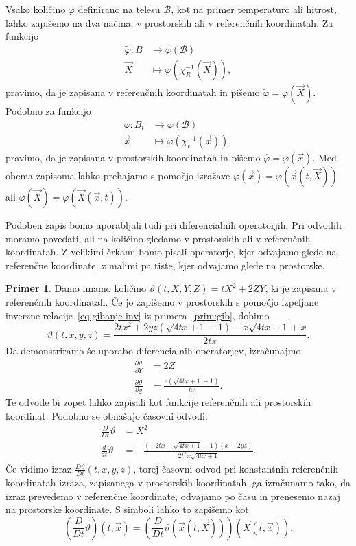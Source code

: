 \documentclass[a4paper,twoside]{article}
\theoremstyle{definition} %
\newtheorem{primer}[definicija]{Primer}
\theoremstyle{plain} %
\numberwithin{equation}{section}
\newcommand{\B}{\mathcal{B}}
\renewcommand{\phi}{\varphi}
\newcommand{\dpar}[2]{\ensuremath{\frac{\partial #1}{\partial #2}}}
\newcommand{\dd}[2]{\ensuremath{\frac{d #1}{d #2}}}
\newcommand{\ddt}[1]{\dd{#1}{t}}
\newcommand{\DD}[2]{\ensuremath{\frac{D #1}{D #2}}}
\newcommand{\DDt}[1]{\DD{#1}{t}}
\newcommand{\vX}{\vec{X}}
\newcommand{\vx}{\vec{x}}
\begin{document}
Vsako količino $\phi$ definirano na telesu $\B$, kot na primer temperaturo ali
hitrost, lahko zapišemo na dva načina, v
prostorskih ali v referenčnih koordinatah. Za funkcijo
\begin{align}
  \tilde \phi\colon B &\to \phi(\B) \nonumber \\
  \vX&\mapsto \phi(\chi_R^{-1}(\vX)), \label{eq:toref}
\end{align}
pravimo, da je zapisana v referenčnih koordinatah in pišemo $\tilde\phi =
\phi(\vX)$.
Podobno za funkcijo
\begin{align}
  \hat \phi\colon B_t &\to \phi(\B) \nonumber \\
  \vx&\mapsto \phi(\chi_t^{-1}(\vx)), \label{eq:topro}
\end{align}
pravimo, da je zapisana v prostorskih koordinatah in pišemo $\hat\phi = \phi(\vx)$.
Med obema zapisoma lahko prehajamo s pomočjo izražave $\phi(\vx) = \phi(\vx(t, \vX))$
ali $\phi(\vX) = \phi(\vX(\vx, t))$.

Podoben zapis bomo uporabljali tudi pri diferencialnih operatorjih. Pri odvodih
moramo povedati, ali na količino gledamo v prostorskih ali v referenčnih
koordinatah. Z velikimi črkami bomo pisali operatorje, kjer odvajamo glede na
referenčne koordinate, z malimi pa tiste, kjer odvajamo glede na prostorske.

\begin{primer}
  Damo imamo količino $\vartheta(t, X, Y, Z) = tX^2 + 2 ZY$, ki je zapisana v
  referenčnih koordinatah. Če jo zapišemo v prostorskih s pomočjo izpeljane
  inverzne relacije~\eqref{eq:gibanje-inv} iz primera~\ref{prim:gib}, dobimo
  \[
    \vartheta(t, x, y, z) = \frac{2 t x^2+2 y z \left(\sqrt{4 t x+1}-1\right)-x
    \sqrt{4 t x+1}+x}{2 t x}.
  \]
  Da demonstriramo še uporabo diferencialnih operatorjev, izračunajmo
  \begin{align*}
    \dpar{\vartheta}{Y} &= 2Z  \\
    \dpar{\vartheta}{y} &= \frac{z \left(\sqrt{4 t x+1}-1\right)}{t x}.
  \end{align*}
  Te odvode bi zopet lahko zapisali kot funkcije referenčnih ali prostorskih
  koordinat. Podobno se obnašajo časovni odvodi.
  \begin{align*}
    \DDt{} \vartheta &= X^2 \\
    \ddt{} \vartheta &=  -\frac{\left(-2 t x+\sqrt{4 t x+1}-1\right) (x-2 y
    z)}{2 t^2 x \sqrt{4 t x+1}}.
  \end{align*}
  Če vidimo izraz $\DDt \vartheta(t, x, y, z)$, torej časovni odvod pri
  konstantnih referenčnih koordinatah izraza, zapisanega v prostorskih
  koordinatah, ga izračunamo tako, da izraz prevedemo v referenčne koordinate,
  odvajamo po času in prenesemo nazaj na prostorske koordinate. S simboli
  lahko to zapišemo kot
  \[
    \left(\DDt{} \vartheta\right)(t, \vx) = \left( \DDt{}\vartheta(\vx(t, \vX))
    \right)(\vX(t, \vx)).
  \]
\end{primer}
\end{document}
